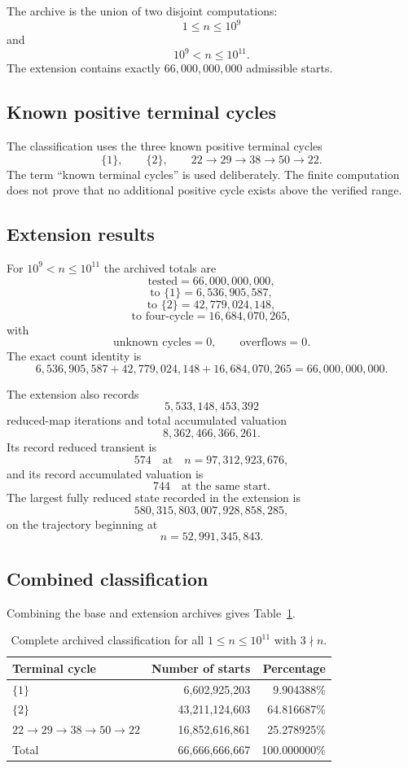 \documentclass[11pt]{article}
\theoremstyle{definition}
\theoremstyle{remark}
\begin{document}
The archive is the union of two disjoint computations:
\[
1\le n\le10^9
\]
and
\[
10^9<n\le10^{11}.
\]
The extension contains exactly $66,000,000,000$ admissible starts.

\subsection{Known positive terminal cycles}

The classification uses the three known positive terminal cycles
\[
\{1\},\qquad
\{2\},\qquad
22\to29\to38\to50\to22.
\]
The term ``known terminal cycles'' is used deliberately.  The finite computation does not prove that no additional positive cycle exists above the verified range.

\subsection{Extension results}

For $10^9<n\le10^{11}$ the archived totals are
\[
\text{tested}=66,000,000,000,
\]
\[
\text{to }\{1\}=6,536,905,587,
\]
\[
\text{to }\{2\}=42,779,024,148,
\]
\[
\text{to four-cycle}=16,684,070,265,
\]
with
\[
\text{unknown cycles}=0,\qquad
\text{overflows}=0.
\]
The exact count identity is
\[
6,536,905,587+
42,779,024,148+
16,684,070,265
=
66,000,000,000.
\]

The extension also records
\[
5,533,148,453,392
\]
reduced-map iterations and total accumulated valuation
\[
8,362,466,366,261.
\]
Its record reduced transient is
\[
574
\quad\text{at}\quad
n=97,312,923,676,
\]
and its record accumulated valuation is
\[
744
\quad\text{at the same start}.
\]
The largest fully reduced state recorded in the extension is
\[
580,315,803,007,928,858,285,
\]
on the trajectory beginning at
\[
n=52,991,345,843.
\]

\subsection{Combined classification}

Combining the base and extension archives gives Table~\ref{tab:combined}.

\begin{table}[ht]
\centering
\caption{Complete archived classification for all $1\le n\le10^{11}$ with $3\nmid n$.}
\label{tab:combined}
\begin{tabular}{lrr}
\toprule
Terminal cycle & Number of starts & Percentage\\
\midrule
$\{1\}$ & 6,602,925,203 & 9.904388\%\\
$\{2\}$ & 43,211,124,603 & 64.816687\%\\
$22\to29\to38\to50\to22$ & 16,852,616,861 & 25.278925\%\\
\midrule
Total & 66,666,666,667 & 100.000000\%\\
\bottomrule
\end{tabular}
\end{table}
\end{document}
